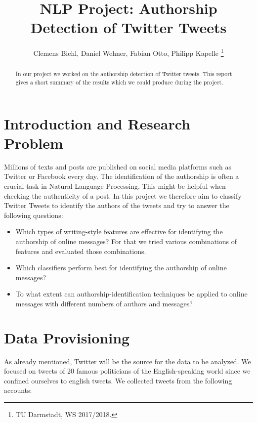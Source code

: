 \documentclass[journal, a4paper]{IEEEtran}
\begin{document}
\title{NLP Project: Authorship Detection of Twitter Tweets}
\author{Clemens Biehl, Daniel Wehner, Fabian Otto, Philipp Kapelle
\thanks{TU Darmstadt, WS 2017/2018.}}
\maketitle

\begin{abstract}
In our project we worked on the authorship detection of Twitter tweets. This report gives a short summary of the results which we could produce during the project.
\end{abstract}
	
\section{Introduction and Research Problem}
Millions of texts and posts are published on social media platforms such as Twitter or Facebook every day. The identification of the authorship is often a crucial task in Natural Language Processing. This might be helpful when checking the authenticity of a post. In this project we therefore aim to classify Twitter Tweets to identify the authors of the tweets and try to answer the following questions:

\begin{itemize}
\item Which types of writing-style features are effective for identifying the authorship of online messages? For that we tried various combinations of features and evaluated those combinations.
\item Which classifiers perform best for identifying the authorship of online messages?
\item To what extent can authorship-identification techniques be applied to online messages with different numbers of authors and messages?
\end{itemize}

\section{Data Provisioning}
\label{sec:provisioning}

As already mentioned, Twitter will be the source for the data to be analyzed. We focused on tweets of 20 famous politicians of the English-speaking world since we confined ourselves to english tweets. We collected tweets from the following accounts:
\end{document}
